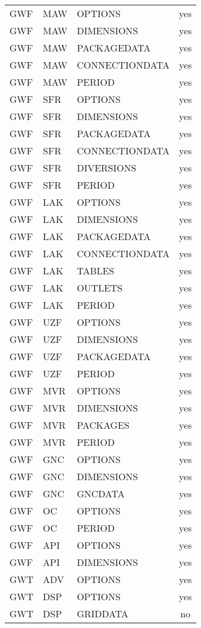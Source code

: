 \begin{longtable}{p{1.5cm} p{1.5cm} p{3cm} c}
\hline
GWF & MAW & OPTIONS & yes \\ 
GWF & MAW & DIMENSIONS & yes \\ 
GWF & MAW & PACKAGEDATA & yes \\ 
GWF & MAW & CONNECTIONDATA & yes \\ 
GWF & MAW & PERIOD & yes \\ 
\hline
GWF & SFR & OPTIONS & yes \\ 
GWF & SFR & DIMENSIONS & yes \\ 
GWF & SFR & PACKAGEDATA & yes \\ 
GWF & SFR & CONNECTIONDATA & yes \\ 
GWF & SFR & DIVERSIONS & yes \\ 
GWF & SFR & PERIOD & yes \\ 
\hline
GWF & LAK & OPTIONS & yes \\ 
GWF & LAK & DIMENSIONS & yes \\ 
GWF & LAK & PACKAGEDATA & yes \\ 
GWF & LAK & CONNECTIONDATA & yes \\ 
GWF & LAK & TABLES & yes \\ 
GWF & LAK & OUTLETS & yes \\ 
GWF & LAK & PERIOD & yes \\ 
\hline
GWF & UZF & OPTIONS & yes \\ 
GWF & UZF & DIMENSIONS & yes \\ 
GWF & UZF & PACKAGEDATA & yes \\ 
GWF & UZF & PERIOD & yes \\ 
\hline
GWF & MVR & OPTIONS & yes \\ 
GWF & MVR & DIMENSIONS & yes \\ 
GWF & MVR & PACKAGES & yes \\ 
GWF & MVR & PERIOD & yes \\ 
\hline
GWF & GNC & OPTIONS & yes \\ 
GWF & GNC & DIMENSIONS & yes \\ 
GWF & GNC & GNCDATA & yes \\ 
\hline
GWF & OC & OPTIONS & yes \\ 
GWF & OC & PERIOD & yes \\ 
\hline
GWF & API & OPTIONS & yes \\ 
GWF & API & DIMENSIONS & yes \\ 
\hline
GWT & ADV & OPTIONS & yes \\ 
\hline
GWT & DSP & OPTIONS & yes \\ 
GWT & DSP & GRIDDATA & no \\ 

\end{longtable}
